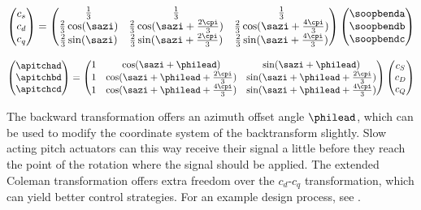 \begin{equation}
  \begin{pmatrix}
    c_s \\ c_d \\ c_q
  \end{pmatrix}
  =
  \begin{pmatrix}
    \frac{1}{3} & \frac{1}{3} & \frac{1}{3} \\
    \frac{2}{3} \cos(\sazi) & \frac{2}{3} \cos(\sazi + \frac{2\cpi}{3}) & \frac{2}{3} \cos(\sazi + \frac{4\cpi}{3}) \\
    \frac{2}{3} \sin(\sazi) & \frac{2}{3} \sin(\sazi + \frac{2\cpi}{3}) & \frac{2}{3} \sin(\sazi + \frac{4\cpi}{3})
  \end{pmatrix}
  \begin{pmatrix}
    \soopbenda \\
    \soopbendb \\
    \soopbendc
  \end{pmatrix}
  \label{eq:coleman-forward}
\end{equation}

\begin{equation}
  \begin{pmatrix}
    \apitchad \\
    \apitchbd \\
    \apitchcd
  \end{pmatrix}
  =
  \begin{pmatrix}
    1 & \cos(\sazi + \philead) & \sin(\sazi + \philead) \\
    1 & \cos(\sazi + \philead + \frac{2\cpi}{3}) & \sin(\sazi + \philead + \frac{2\cpi}{3}) \\
    1 & \cos(\sazi + \philead + \frac{4\cpi}{3}) & \sin(\sazi + \philead + \frac{4\cpi}{3})
  \end{pmatrix}
  \begin{pmatrix}
    c_S \\ c_D \\ c_Q
  \end{pmatrix}
\label{eq:coleman-backward}
\end{equation}

The backward transformation offers an azimuth offset angle $\philead$, which can be used to modify the coordinate system of the backtransform slightly. Slow acting pitch actuators can this way receive their signal a little before they reach the point of the rotation where the signal should be applied. The extended Coleman transformation offers extra freedom over the $c_d$-$c_q$ transformation, which can yield better control strategies. For an example design process, see \citet{luAnalysisDesignColeman2015}.


